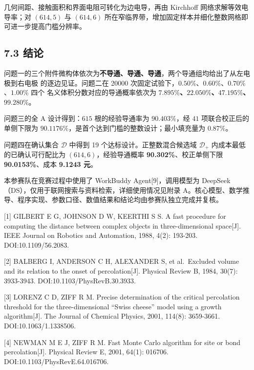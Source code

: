 几何间距、接触面积和界面电阻可转化为边电导，再由 Kirchhoff 网络求解等效电导率；对 \((614,5)\) 与 \((614,6)\) 所在窄临界带，增加固定样本并细化整数网格即可进一步提高门槛分辨率。

\subsection{7.3 结论}\label{ux7ed3ux8bba}

问题一的三个附件微构体依次为\textbf{不导通、导通、导通}，两个导通组均给出了从左电极到右电极 的逐边见证。问题二在 20000 次固定试验下，\(0.50\%\)、\(0.60\%\)、\(0.70\%\)、\(1.00\%\) 四个 名义体积分数对应的导通概率依次为 \textbf{\(7.895\%\)、\(22.050\%\)、\(47.195\%\)、\(99.280\%\)}。

问题三的全 A 设计得到：\(615\) 根的经验导通率为 \textbf{\(90.403\%\)}，经 \(41\) 项联合校正后的单侧下限为 \textbf{\(90.1176\%\)}，是首个达到门槛的整数设计；最小填充量为 \textbf{\(0.87\%\)}。

问题四在确认集合 \(\mathcal D\) 中得到 19 个达标设计。正整数混合候选域 \(\mathcal D_+\) 内成本最低的已确认可行配比为 \textbf{\((614,6)\)}，经验导通概率 \textbf{90.302\%}、校正单侧下限 \textbf{90.0153\%}、成本 \textbf{9.1243 元}。


本参赛队在竞赛过程中使用了 WorkBuddy Agent{[}9{]}，调用模型为 DeepSeek（DS），仅用于联网搜索与资料检索，详细使用情况见附录 A。核心模型、数学推导、程序实现、参数口径、数值结果和结论均由参赛队独立完成并复核。

\endgroup
{}
\begingroup
{}

{[}1{]} GILBERT E G, JOHNSON D W, KEERTHI S S. A fast procedure for computing the distance between complex objects in three-dimensional space{[}J{]}. IEEE Journal on Robotics and Automation, 1988, 4(2): 193-203. DOI:10.1109/56.2083.

{[}2{]} BALBERG I, ANDERSON C H, ALEXANDER S, et al.~Excluded volume and its relation to the onset of percolation{[}J{]}. Physical Review B, 1984, 30(7): 3933-3943. DOI:10.1103/PhysRevB.30.3933.

{[}3{]} LORENZ C D, ZIFF R M. Precise determination of the critical percolation threshold for the three-dimensional ``Swiss cheese'' model using a growth algorithm{[}J{]}. The Journal of Chemical Physics, 2001, 114(8): 3659-3661. DOI:10.1063/1.1338506.

{[}4{]} NEWMAN M E J, ZIFF R M. Fast Monte Carlo algorithm for site or bond percolation{[}J{]}. Physical Review E, 2001, 64(1): 016706. DOI:10.1103/PhysRevE.64.016706.

